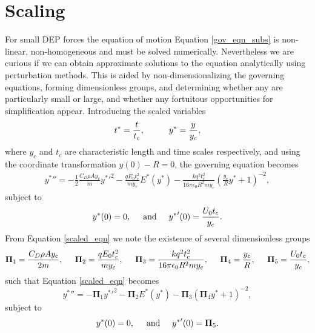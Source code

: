 \documentclass[12pt,a4paper,oneside]{book}
\begin{document}
\section{Scaling}
For small DEP forces the equation of motion Equation \ref{gov_eqn_subs} is non-linear, non-homogeneous and must be solved numerically. Nevertheless we are curious if we can obtain approximate solutions to the equation analytically using perturbation methods. This is aided by non-dimensionalizing the governing equations, forming dimensionless groups, and determining whether any are particularly small or large, and whether any fortuitous opportunities for simplification appear. Introducing the scaled variables
\begin{equation}
 t^* = \frac{t}{t_c}, \hspace{10 mm} y^* = \frac{y}{y_c}, \end{equation}
where $y_c$ and $t_c$ are characteristic length and time scales respectively, and using the coordinate transformation $y(0) - R = 0$, the governing equation becomes
\begin{eqnarray}
& {y^*}'' = - \frac{1}{2} \frac{C_D \rho A y_c}{m} {y^*}'^2
- \frac{q E_0 t_c^2}{m y_c} E^* ( {y^*} ) 
- \frac{k q^2 t_c^2}{16 \pi \epsilon_0 R^2 m y_c} \left( \frac{y_c}{R} {y^*} + 1 \right)^{-2}, & \label{scaled_eqn}
\end{eqnarray}
subject to 
\begin{equation*}
{y^*}(0) = 0, \hspace{5 mm} \mbox{and} \hspace{5 mm} {y^*}'(0) = \frac{U_0 t_c}{y_c} .
\end{equation*}
From Equation \ref{scaled_eqn} we note the existence of several dimensionless groups
\[ \mathbf{\Pi}_1 = \frac{C_D \rho A y_c}{2 m}, \hspace{5 mm}
\mathbf{\Pi}_2 = \frac{q E_0 t_c^2}{m y_c}, \hspace{5 mm}
\mathbf{\Pi}_3 = \frac{k q^2 t_c^2}{16 \pi \epsilon_0 R^2 m y_c}, \hspace{5 mm}
\mathbf{\Pi}_4 = \frac{y_c}{R}, \hspace{5 mm}
\mathbf{\Pi}_5 = \frac{U_0 t_c}{y_c},\]
such that Equation \ref{scaled_eqn} becomes
\begin{equation}
\label{pi_terms}
 {y^*}'' = - \mathbf{\Pi}_1 {y^*}'^2
- \mathbf{\Pi}_2 E^* ( {y^*} ) 
- \mathbf{\Pi}_3 \left( \mathbf{\Pi}_4 {y^*} + 1 \right)^{-2},
\end{equation}
subject to
\begin{equation*}
{y^*}(0) = 0, \hspace{5 mm} \mbox{and} \hspace{5 mm} {y^*}'(0) = \mathbf{\Pi}_5 .
\end{equation*}
\end{document}
